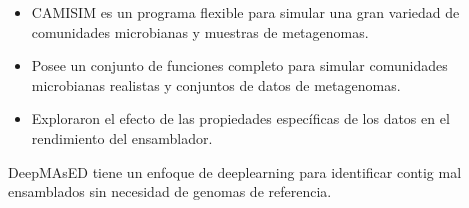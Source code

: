 \begin{itemize}
    \item CAMISIM es un programa flexible para simular una gran variedad de comunidades microbianas y muestras de metagenomas. 
    \item Posee un conjunto de funciones completo para simular comunidades microbianas realistas y conjuntos de datos de metagenomas.
    \item Exploraron el efecto de las propiedades específicas de los datos en el rendimiento del ensamblador.
\end{itemize}



DeepMAsED tiene un enfoque de deeplearning para identificar contig  mal ensamblados sin necesidad de genomas de referencia.\\



